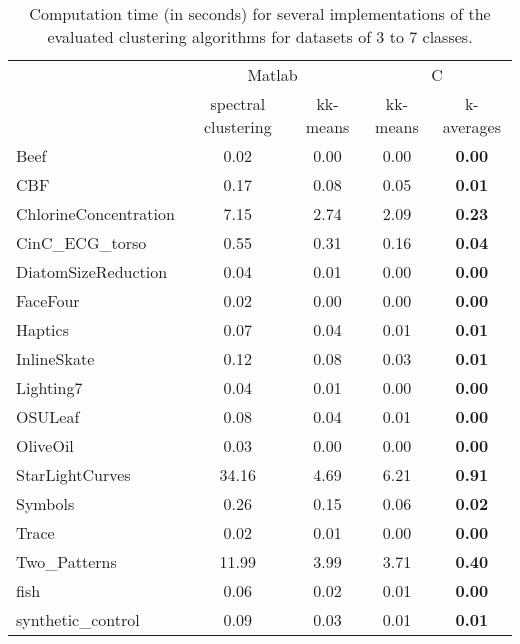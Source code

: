 \documentclass[10pt,letterpaper]{article}
\begin{document}
\begin{table}
\begin{center}
\caption{Computation time (in seconds) for several implementations of the evaluated clustering algorithms for datasets of 3 to 7 classes.}
\label{tab:resultSpeed-37}
\begin{tabular}{lcccc}
  & \multicolumn{2}{c}{Matlab} & \multicolumn{2}{c}{C} \\
  & spectral clustering & kk-means & kk-means & k-averages \\
\hline
Beef & 0.02 & 0.00 & 0.00 & \textbf{0.00} \\
CBF & 0.17 & 0.08 & 0.05 & \textbf{0.01} \\
ChlorineConcentration & 7.15 & 2.74 & 2.09 & \textbf{0.23} \\
CinC\_ECG\_torso & 0.55 & 0.31 & 0.16 & \textbf{0.04} \\
DiatomSizeReduction & 0.04 & 0.01 & 0.00 & \textbf{0.00} \\
FaceFour & 0.02 & 0.00 & 0.00 & \textbf{0.00} \\
Haptics & 0.07 & 0.04 & 0.01 & \textbf{0.01} \\
InlineSkate & 0.12 & 0.08 & 0.03 & \textbf{0.01} \\
Lighting7 & 0.04 & 0.01 & 0.00 & \textbf{0.00} \\
OSULeaf & 0.08 & 0.04 & 0.01 & \textbf{0.00} \\
OliveOil & 0.03 & 0.00 & 0.00 & \textbf{0.00} \\
StarLightCurves & 34.16 &  4.69 &  6.21 & \textbf{ 0.91} \\
Symbols & 0.26 & 0.15 & 0.06 & \textbf{0.02} \\
Trace & 0.02 & 0.01 & 0.00 & \textbf{0.00} \\
Two\_Patterns & 11.99 &  3.99 &  3.71 & \textbf{ 0.40} \\
fish & 0.06 & 0.02 & 0.01 & \textbf{0.00} \\
synthetic\_control & 0.09 & 0.03 & 0.01 & \textbf{0.01} \\
\end{tabular}
\end{center}
\end{table}


\end{document}
